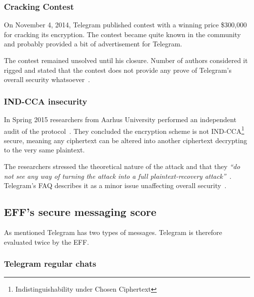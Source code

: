 \documentclass[thesis=M,english]{FITthesis}[2012/10/20]
\begin{document}
\subsubsection{Cracking Contest}

On November 4, 2014, Telegram published contest with a winning price \$300,000 for cracking its encryption. The contest became quite known in the community and probably provided a bit of advertisement for Telegram.

The contest remained unsolved until his closure. Number of authors considered it rigged and stated that the contest does not provide any prove of Telegram's overall security whatsoever~\cite{telegramcontestfail,telegramcontestfail2}.

\subsubsection{IND-CCA insecurity}

In Spring 2015 researchers from Aarhus University performed an independent audit of the protocol~\cite{telegram-aarhus}. They concluded the encryption scheme is not IND-CCA\footnote{Indistinguishability under Chosen Ciphertext} secure, meaning any ciphertext can be altered into another ciphertext decrypting to the very same plaintext.

The researchers stressed the theoretical nature of the attack and that they \emph{``do not see any way of turning the attack into a full plaintext-recovery attack''}~\cite{telegram-aarhus}. Telegram's FAQ describes it as a minor issue unaffecting overall security~\cite{telegram-techfaq}.


\subsection{EFF's secure messaging score}

As mentioned Telegram has two types of messages. Telegram is therefore evaluated twice by the EFF.


\subsubsection{Telegram regular chats}
\end{document}
